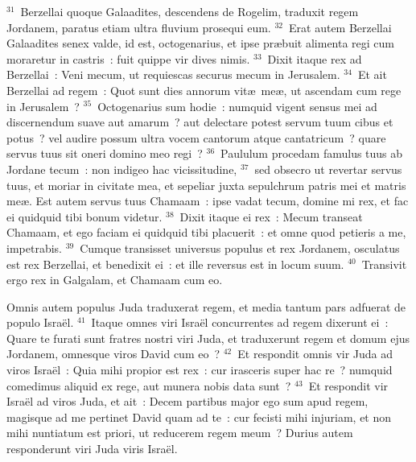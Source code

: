 ${}^{31}$~Berzellai quoque Galaadites, descendens de Rogelim, traduxit regem Jordanem, paratus etiam ultra fluvium prosequi eum.
${}^{32}$~Erat autem Berzellai Galaadites senex valde, id est, octogenarius, et ipse pr\ae buit alimenta regi cum moraretur in castris~: fuit quippe vir dives nimis.
${}^{33}$~Dixit itaque rex ad Berzellai~: Veni mecum, ut requiescas securus mecum in Jerusalem.
${}^{34}$~Et ait Berzellai ad regem~: Quot sunt dies annorum vit\ae\ me\ae , ut ascendam cum rege in Jerusalem~?
${}^{35}$~Octogenarius sum hodie~: numquid vigent sensus mei ad discernendum suave aut amarum~? aut delectare potest servum tuum cibus et potus~? vel audire possum ultra vocem cantorum atque cantatricum~? quare servus tuus sit oneri domino meo regi~?
${}^{36}$~Paululum procedam famulus tuus ab Jordane tecum~: non indigeo hac vicissitudine,
${}^{37}$~sed obsecro ut revertar servus tuus, et moriar in civitate mea, et sepeliar juxta sepulchrum patris mei et matris me\ae . Est autem servus tuus Chamaam~: ipse vadat tecum, domine mi rex, et fac ei quidquid tibi bonum videtur.
${}^{38}$~Dixit itaque ei rex~: Mecum transeat Chamaam, et ego faciam ei quidquid tibi placuerit~: et omne quod petieris a me, impetrabis.
${}^{39}$~Cumque transisset universus populus et rex Jordanem, osculatus est rex Berzellai, et benedixit ei~: et ille reversus est in locum suum.
${}^{40}$~Transivit ergo rex in Galgalam, et Chamaam cum eo.

 Omnis autem populus Juda traduxerat regem, et media tantum pars adfuerat de populo Isra\"el.
${}^{41}$~Itaque omnes viri Isra\"el concurrentes ad regem dixerunt ei~: Quare te furati sunt fratres nostri viri Juda, et traduxerunt regem et domum ejus Jordanem, omnesque viros David cum eo~?
${}^{42}$~Et respondit omnis vir Juda ad viros Isra\"el~: Quia mihi propior est rex~: cur irasceris super hac re~? numquid comedimus aliquid ex rege, aut munera nobis data sunt~?
${}^{43}$~Et respondit vir Isra\"el ad viros Juda, et ait~: Decem partibus major ego sum apud regem, magisque ad me pertinet David quam ad te~: cur fecisti mihi injuriam, et non mihi nuntiatum est priori, ut reducerem regem meum~? Durius autem responderunt viri Juda viris Isra\"el.

